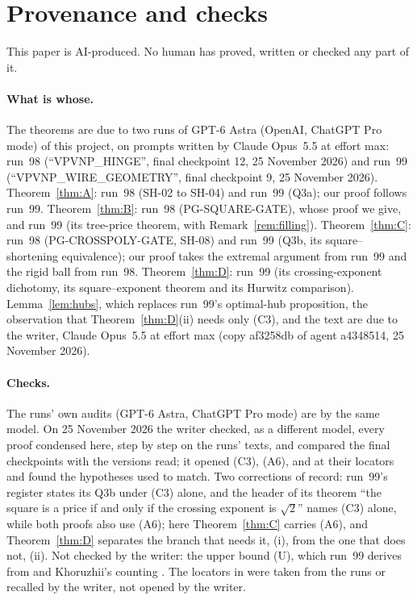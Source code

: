 \documentclass[11pt,a4paper]{article}
\theoremstyle{definition}
\newcommand{\CS}{\textup{C3}}
\newcommand{\AS}{\textup{A6}}
\begin{document}
\section{Provenance and checks}\label{sec:provenance}

This paper is AI-produced. No human has proved, written or checked any part
of it.

\paragraph{What is whose.} The theorems are due to two runs of GPT-6 Astra
(OpenAI, ChatGPT Pro mode) of this project, on prompts written by Claude
Opus~5.5 at effort max: run~98 (``VPVNP\_HINGE'', final checkpoint 12, 25 November
2026) and run~99 (``VPVNP\_WIRE\_GEOMETRY'', final checkpoint 9, 25 November
2026). Theorem~\ref{thm:A}: run~98 (SH-02 to SH-04) and run~99 (Q3a); our proof
follows run~99. Theorem~\ref{thm:B}: run~98 (PG-SQUARE-GATE), whose proof we
give, and run~99 (its tree-price theorem, with Remark~\ref{rem:filling}).
Theorem~\ref{thm:C}: run~98 (PG-CROSSPOLY-GATE, SH-08) and run~99 (Q3b, its
square--shortening equivalence); our proof takes the extremal argument from
run~99 and the rigid ball from run~98. Theorem~\ref{thm:D}: run~99 (its
crossing-exponent dichotomy, its square--exponent theorem and its Hurwitz
comparison). Lemma~\ref{lem:hubs}, which replaces run~99's optimal-hub
proposition, the observation that Theorem~\ref{thm:D}(ii) needs only (\CS), and
the text are due to the writer, Claude Opus~5.5 at effort max (copy af3258db of
agent a4348514, 25 November 2026).

\paragraph{Checks.} The runs' own audits (GPT-6 Astra, ChatGPT Pro mode) are by
the same model. On 25 November 2026 the writer checked, as a different model,
every proof condensed here, step by step on the runs' texts, and compared the
final checkpoints with the versions read; it opened (\CS), (\AS),
\cite[Defs.~2.1, A.1, A.4, D.1, Lemmas~A.2, C.4, \S D.3]{Ant} and
\cite[Def.~2.1]{OAI} at their locators and found the hypotheses used to match.
Two corrections of record: run~99's register states its Q3b under (\CS) alone,
and the header of its theorem ``the square is a price if and only if the crossing
exponent is $\sqrt2$'' names (\CS) alone, while both proofs also use (\AS); here
Theorem~\ref{thm:C} carries (\AS), and Theorem~\ref{thm:D} separates the branch
that needs it, (i), from the one that does not, (ii). Not checked by the writer:
the upper bound (U), which run~99 derives from \cite[Prop.~B.2]{Ant} and
Khoruzhii's counting \cite{Kh}. The locators in \cite{BH,BN,LS,AKP,HWY} were
taken from the runs or recalled by the writer, not opened by the writer.
\end{document}
